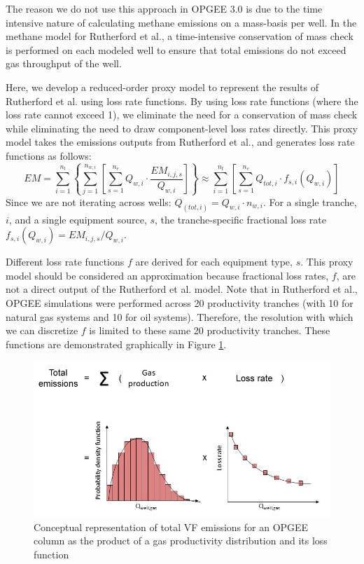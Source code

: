 \documentclass[11pt]{report}
\begin{document}
The reason we do not use this approach in OPGEE 3.0 is due to the time intensive nature of calculating methane emissions on a mass-basis per well. In the methane model for Rutherford et al., a time-intensive conservation of mass check is performed on each modeled well to ensure that total emissions do not exceed gas throughput of the well.

Here, we develop a reduced-order proxy model to represent the results of Rutherford et al. using loss rate functions. By using loss rate functions (where the loss rate cannot exceed 1), we eliminate the need for a conservation of mass check while eliminating the need to draw component-level loss rates directly. This proxy model takes the emissions outputs from Rutherford et al., and generates loss rate functions as follows:
\begin{equation}
 EM=\sum_{i=1}^{n_t} \left\{ \sum_{j=1}^{n_{w,i}} \left[ \sum_{s=1}^{n_e} Q_{w,i} \cdot \frac{EM_{i,j,s}}{Q_{w,i}} \right] \right\} 
 \approx
\sum_{i=1}^{n_t} \left[ \sum_{s=1}^{n_e} Q_{tot,i} \cdot f_{s,i}(Q_{w,i}) \right]
\end{equation}
Since we are not iterating across wells: $Q_{(tot,i)}=Q_{w,i} \cdot n_{w,i}$. For a single tranche, $i$, and a single equipment source, $s$, the tranche-specific fractional loss rate $f_{s,i}(Q_{w,i})= EM_{i,j,s} / Q_{w,i}$.

Different loss rate functions $f$ are derived for each equipment type, $s$. This proxy model should be considered an approximation because fractional loss rates, $f$, are not a direct output of the Rutherford et al. model. Note that in Rutherford et al., OPGEE simulations were performed across 20 productivity tranches (with 10 for natural gas systems and 10 for oil systems). Therefore, the resolution with which we can discretize $f$ is limited to these same 20 productivity tranches. These functions are demonstrated graphically in Figure \ref{fig:scale_up_tranche_VF}.
 
 
 \begin{figure}[t]
\includegraphics[width=0.8\columnwidth]{images/Scale_up_VF_tranches.jpg}
\caption{Conceptual representation of total VF emissions for an OPGEE column as the product of a gas productivity distribution and its loss function}
\label{fig:scale_up_tranche_VF}
\end{figure}  
\end{document}
